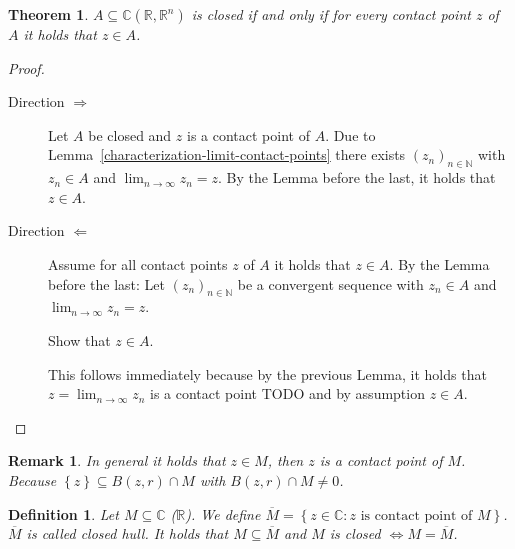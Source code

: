 \documentclass[a4paper,landscape,twocolumn]{article}
\newtheorem{theorem}{Theorem}
\newtheorem{defi}{Definition}
\newtheorem{rem}{Remark}
\newcommand\set[1]{\left\{#1\right\}}
\newcommand\seq[1]{{\left(#1\right)}_{n \in \mathbb N}}
\begin{document}
\begin{theorem}
  $A \subseteq \mathbb C (\mathbb R, \mathbb R^n)$ is closed if and only if
  for every contact point $z$ of $A$ it holds that $z \in A$.
\end{theorem}
\begin{proof}
  \begin{description}
    \item[Direction $\Rightarrow$]
      Let $A$ be closed and $z$ is a contact point of $A$.
      Due to Lemma~\ref{characterization-limit-contact-points} there exists $\seq{z_n}$
      with $z_n \in A$ and $\lim_{n\to\infty} z_n = z$.
      By the Lemma before the last, it holds that $z \in A$.
    \item[Direction $\Leftarrow$]
      Assume for all contact points $z$ of $A$ it holds that $z \in A$.
      By the Lemma before the last: Let $\seq{z_n}$ be a convergent sequence with
      $z_n \in A$ and $\lim_{n\to\infty} z_n = z$.

      Show that $z \in A$.

      This follows immediately because by the previous Lemma, it holds that
      $z = \lim_{n\to\infty} z_n$ is a contact point TODO
      and by assumption $z \in A$.
  \end{description}
\end{proof}
\begin{rem}
  In general it holds that $z \in M$, then $z$ is a contact point of $M$.
  Because $\set{z} \subseteq B(z, r) \cap M$ with $B(z, r) \cap M \neq 0$.
\end{rem}
\begin{defi}
  Let $M \subseteq \mathbb C$ ($\mathbb R$).
  We define $\overline{M} = \set{z \in \mathbb C: z \text{ is contact point of } M}$.
  $\overline{M}$ is called \emph{closed hull}.
  It holds that $M \subseteq \overline{M}$ and $M$ is closed
  $\Leftrightarrow M = \overline{M}$.
\end{defi}
\end{document}
